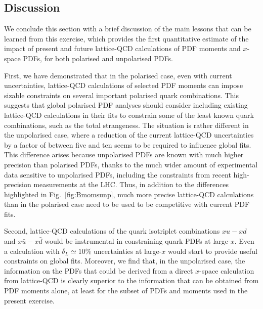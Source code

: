 \subsection{Discussion}

We conclude this section with a brief discussion of the main lessons that
can be learned from this exercise, which provides the first quantitative estimate
of the impact of present and future lattice-QCD calculations of PDF moments
and $x$-space PDFs, for both polarised and unpolarised PDFs.

First, we have demonstrated that in the polarised case,
even with current uncertainties, lattice-QCD calculations of
selected PDF moments can impose sizable constraints on several
important polarised quark combinations.
%
This suggests that global polarised PDF analyses should consider
including existing lattice-QCD calculations in their fits to constrain some
of the least known quark combinations, such as the total strangeness.
%
The situation is rather different in the unpolarised case,
where a reduction of the current lattice-QCD uncertainties by a factor of between five 
and ten seems to be required to influence global fits.
%
This difference arises because unpolarised PDFs are known with much higher precision than polarised
PDFs, thanks to the much wider amount of experimental data sensitive to unpolarised PDFs,
including the constraints from recent high-precision measurements at the
LHC.
%
Thus, in addition to the differences highlighted  in Fig.~\ref{fig:Bmomsunp},
much more precise lattice-QCD calculations than in the polarised case 
need to be used to be competitive with current PDF fits.


Second, lattice-QCD calculations of the quark isotriplet combinations
$xu-xd$ and $x\bar{u}-x\bar{d}$ would be instrumental in constraining
quark PDFs at large-$x$.
%
Even a calculation with $\delta_L\simeq 10\%$ uncertainties at large-$x$ would
start to provide useful constraints on global fits.
%
Moreover, we find that, in the unpolarised case, the information on the
PDFs that could be derived from a direct $x$-space calculation
from lattice-QCD is clearly superior to the information that can be obtained
from PDF moments alone, at least for the subset of PDFs and moments used in the present
exercise.

